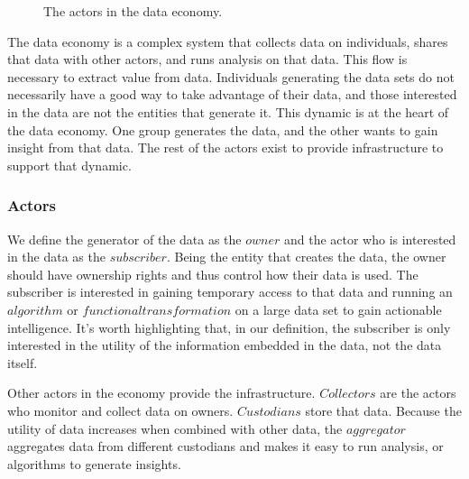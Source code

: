 \begin{figure*}[!htbp] 
    \centering
    \caption{The actors in the data economy.}
    \label{fig:DataActors}
\end{figure*}

The data economy is a complex system that collects data on individuals, shares that data with other actors, and runs analysis on that data. This flow is 
necessary to extract value from data. Individuals generating the data sets do not necessarily have a good way to take advantage of their data, and those interested 
in the data are not the entities that generate it. This dynamic is at the heart of the data economy. One group generates the data, and the other wants to gain 
insight from that data. The rest of the actors exist to provide infrastructure to support that dynamic.

\subsubsection{Actors}

We define the generator of the data as the $\mathit{owner}$ and the actor who is interested in the data as the $\mathit{subscriber}$. Being the entity that 
creates the data, the owner should have ownership rights and thus control how their data is used. The subscriber is interested in gaining temporary access 
to that data and running an $\mathit{algorithm}$ or $\mathit{functional transformation}$ on a large data set to gain actionable intelligence. It's worth 
highlighting that, in our definition, the subscriber is only interested in the utility of the information embedded in the data, not the data itself.

Other actors in the economy provide the infrastructure. $\mathit{Collectors}$ are the actors who monitor and collect data on owners. $\mathit{Custodians}$ 
store that data. Because the utility of data increases when combined with other data, the $\mathit{aggregator}$ aggregates data from different custodians 
and makes it easy to run analysis, or algorithms to generate insights.

